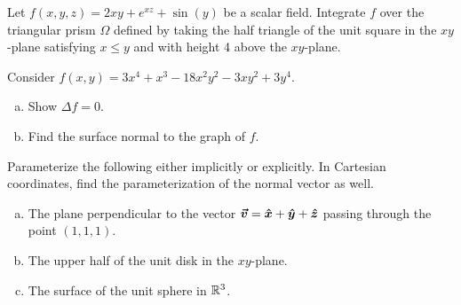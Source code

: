 \documentclass[12pt]{article} %
\begin{document}
\begin{problem}
Let $f(x,y,z)=2xy+e^{xz}+\sin(y)$ be a scalar field. Integrate $f$ over the triangular prism $\Omega$ defined by taking the half triangle of the unit square in the $xy$-plane satisfying $x\leq y$ and with height 4 above the $xy$-plane.
\end{problem}

\begin{problem}
Consider $f(x,y)= 3x^4+x^3-18x^2y^2-3xy^2+3y^4$. 
\begin{enumerate}[(a)]
    \item Show $\Delta f = 0$.
    \item Find the surface normal to the graph of $f$.
\end{enumerate}
\end{problem}

\begin{problem} 
Parameterize the following either implicitly or explicitly. In Cartesian coordinates, find the parameterization of the normal vector as well.
\begin{enumerate}[(a)]
	\item The plane perpendicular to the vector $\boldsymbol{\vec{v}} = \boldsymbol{\hat{x}} + \boldsymbol{\hat{y}} + \boldsymbol{\hat{z}}$ passing through the point $(1,1,1)$.
	\item The upper half of the unit disk in the $xy$-plane.
	\item The surface of the unit sphere in $\mathbb{R}^3$.
\end{enumerate}
\end{problem}
\end{document}

